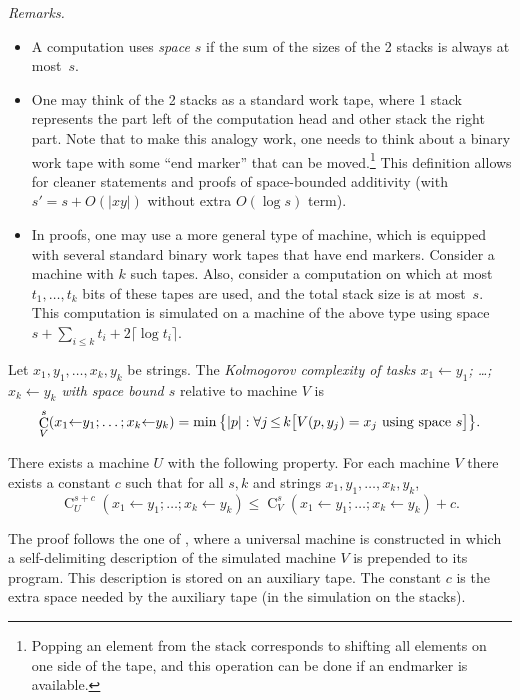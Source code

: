 \documentclass[runningheads]{llncs}
\DeclareMathOperator{\C}{C} \newcommand{\Cev}{\C_\textnormal{ev}} \newcommand{\Codd}{\C_\textnormal{odd}}
\newcommand{\lar}{{\leftarrow}}
\begin{document}
\noindent
{\em Remarks.}
\begin{itemize}[leftmargin=*, label=--]
  \item 
    A computation uses {\em space $s$} if the sum of the sizes of the 2 stacks is always at most~$s$. 
  \item 
    One may think of the 2 stacks as a standard work tape, where 1 stack represents the part left of the computation head and other stack the right part. 
    Note that to make this analogy work, one needs to think about a binary work tape with some ``end marker'' that can be moved.\footnote{ 
      Popping an element from the stack corresponds to shifting all elements on one side of the tape, and this operation can be done if an endmarker is available. 
    }
    This definition allows for cleaner statements and proofs of space-bounded additivity (with $s' = s + O(|xy|)$ without extra $O(\log s)$ term). 
  \item 
    In proofs, one may use a more general type of machine, which is equipped with several standard binary work tapes that have end markers. 
    Consider a machine with $k$ such tapes. Also, consider a computation on which at most $t_1, \ldots, t_k$ bits of these tapes are used, and the total stack size is at most~$s$. 
    This computation is simulated on a machine of the above type using space $s + \sum_{i\le k} t_i + 2\lceil \log t_i \rceil$. 
\end{itemize}




\newcommand{\argg}{x_1 \lar y_1; \ldots; x_k \lar y_k}
\begin{definition}\label{def:onlineComplexity}
  Let $x_1, y_1, \ldots, x_k, y_k$ be strings. 
  The {\em Kolmogorov complexity of tasks $x_1 \lar y_1$; \ldots; $x_k \lar y_k$ with space bound $s$} relative to machine $V$ is
  \[
    \C^s_V(\argg) = \min \big\{|p| : \forall j \mathop{\le} k \big[V(p,y_j) = x_j \textnormal{ using space } s\big]\big\}.
  \]
\end{definition}

\begin{proposition}
  There exists a machine $U$ with the following property. For each machine $V$ there exists a constant $c$ such that for all $s,k$ and strings $x_1,y_1, \ldots, x_k, y_k$, 
  \[
    \C_U^{s+c}(\argg) \le \C_V^s(\argg) + c. 
  \]
\end{proposition}

\noindent
The proof follows the one of \cite[proposition 1]{Bauwens2022Inequalities}, 
where a universal machine is constructed in which a self-delimiting description of the simulated machine $V$ is prepended to its program. 
This description is stored on an auxiliary tape. The constant $c$ is the extra space needed by the auxiliary tape (in the simulation on the stacks). 
\end{document}
